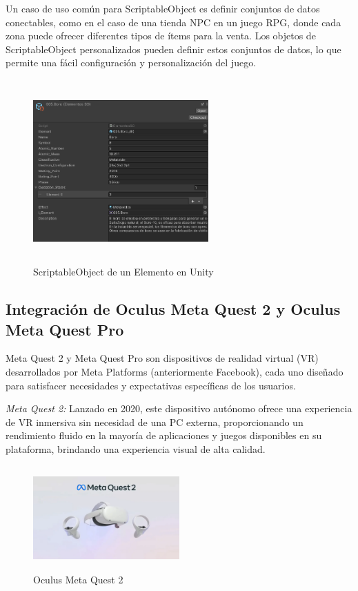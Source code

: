 Un caso de uso común para ScriptableObject es definir conjuntos de datos conectables, como en el caso de una tienda NPC en un juego RPG, donde cada zona puede ofrecer diferentes tipos de ítems para la venta. Los objetos de ScriptableObject personalizados pueden definir estos conjuntos de datos, lo que permite una fácil configuración y personalización del juego.
\begin{figure}[thbp]
    \centering
    \includegraphics[width=0.6\textwidth, height = 7cm]{img/chapter03/ScriptableObject.png}
    \caption{ScriptableObject de un Elemento en Unity}
    \label{fig:components}
\end{figure}
\newpage
\subsection{Integración de Oculus Meta Quest 2 y Oculus Meta Quest Pro}
Meta Quest 2 y Meta Quest Pro son dispositivos de realidad virtual (VR) desarrollados por Meta Platforms (anteriormente Facebook), cada uno diseñado para satisfacer necesidades y expectativas específicas de los usuarios.

\textit{Meta Quest 2:} Lanzado en 2020, este dispositivo autónomo ofrece una experiencia de VR inmersiva sin necesidad de una PC externa, proporcionando un rendimiento fluido en la mayoría de aplicaciones y juegos disponibles en su plataforma, brindando una experiencia visual de alta calidad.

\begin{figure}[thbp]
    \centering
    \includegraphics[width=0.5\textwidth, height = 4cm]{img/chapter03/Meta_Quest_2.png}
    \caption{Oculus Meta Quest 2}
    \label{fig:Oculus_Meta_Quest_2}
\end{figure}

